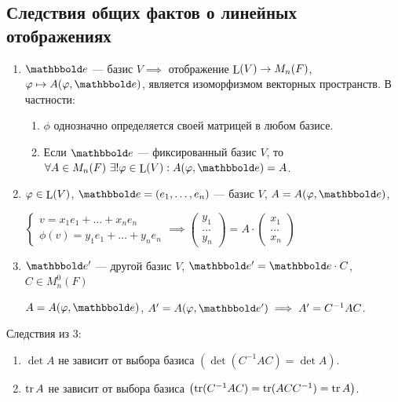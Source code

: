 \subsection{Следствия общих фактов о линейных отображениях}

\begin{enumerate}
    \item $\E$ --- базис $V \implies $ отображение $\operatorname{\mathop{\mathrm{L}}}(V) \to M_n(F)$, $\phi \mapsto A(\phi, \E)$, является изоморфизмом векторных пространств. В частности:
        \begin{enumerate}[label=\alph*)]
        \item $\phi$ однозначно определяется своей матрицей в любом базисе.
        \item Если $\E$ --- фиксированный базис $V$, то $\forall A \in M_n(F) \ \exists! \phi \in \L(V) : A(\phi, \E) = A$.
        \end{enumerate}

    \item
        $\varphi \in \operatorname{\mathop{\mathrm{L}}}(V)$, $\E = (e_1, \dots, e_n)$ --- базис $V$, $A = A(\phi, \E)$, 

        \begin{math}
            \begin{cases}
                v = x_1 e_1 + \dots + x_n e_n \\
                \phi(v) = y_1 e_1 + \dots + y_n e_n
            \end{cases} \implies \begin{pmatrix} y_1 \\ \dots \\ y_n \end{pmatrix} = A \cdot \begin{pmatrix} x_1 \\ \dots \\ x_n \end{pmatrix}
        \end{math}

    \item $\E'$ --- другой базис $V$, $\E' = \E \cdot C$, $C \in M_n^{0}(F)$

        $A = A(\phi, \E)$, $A' = A(\phi, \E') \implies A' = C^{-1} A C$.
\end{enumerate}

Следствия из 3:
\begin{enumerate}[label=\alph*)]
    \item $\det A$ не зависит от выбора базиса $\left(\det (C^{-1} A C) = \det A\right)$.
    \item $\operatorname{\mathop{\mathrm{tr}}} A$ не зависит от выбора базиса $\left(\operatorname{\mathop{\mathrm{tr}}} (C^{-1} A C) = \operatorname{\mathop{\mathrm{tr}}} (ACC^{-1}) = \operatorname{\mathop{\mathrm{tr}}} A\right)$.
\end{enumerate}


